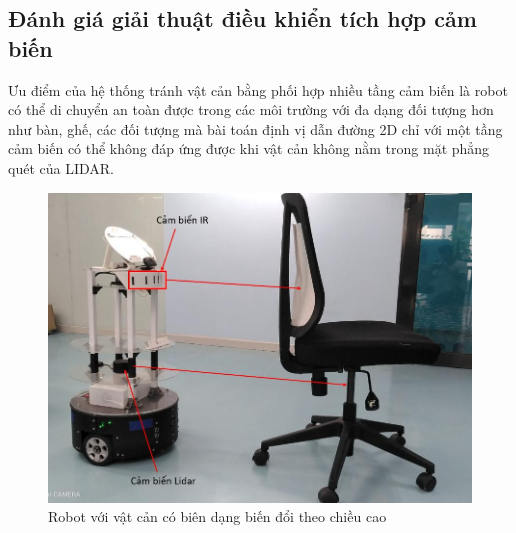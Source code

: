 \subsection{Đánh giá giải thuật điều khiển tích hợp cảm biến}

Ưu điểm của hệ thống tránh vật cản bằng phối hợp nhiều tầng cảm biến là robot có thể di chuyển an toàn được trong các môi trường với đa dạng đối tượng hơn như bàn, ghế, các đối tượng mà bài toán định vị dẫn đường 2D chỉ với một tầng cảm biến có thể không đáp ứng được khi vật cản không nằm trong mặt phẳng quét của LIDAR.

\begin{figure}[htbp]
    \centering
    \includegraphics[width=0.75\linewidth]{figures/RB_scenario_ir_detectingObstacle.png}
    \caption{Robot với vật cản có biên dạng biến đổi theo chiều cao}
    \label{fig:scenario_ir_detectedObstacle}
\end{figure}

